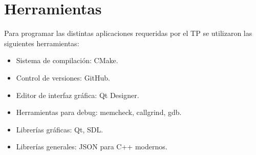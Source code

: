 \documentclass[titlepage,a4paper,12pt]{article}
\begin{document}
\section{Herramientas}

Para programar las distintas aplicaciones requeridas por el TP se utilizaron las siguientes herramientas: 


\begin{itemize}

\item Sistema de compilación: CMake.

\item Control de versiones: GitHub.

\item Editor de interfaz gráfica: Qt Designer.

\item Herramientas para debug: memcheck, callgrind, gdb.

\item Librerías gráficas: Qt, SDL.

\item Librerías generales: JSON para C++ modernos.

\end{itemize}
\end{document}
